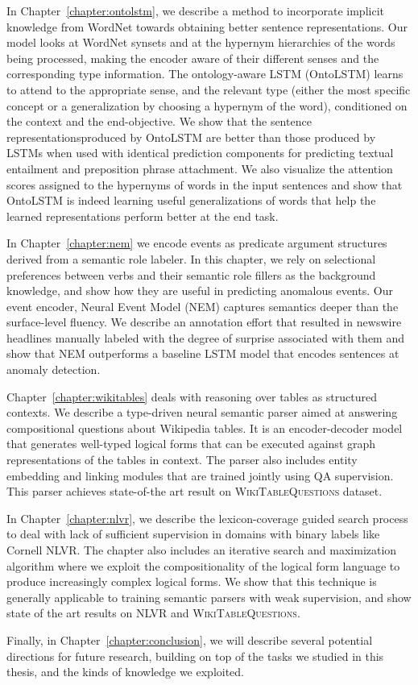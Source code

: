 In Chapter~\ref{chapter:ontolstm}, we describe a method to incorporate implicit knowledge
from WordNet towards obtaining better sentence representations. Our model looks at WordNet synsets
and at the hypernym hierarchies of the words being processed, making the 
encoder aware of their different senses and the corresponding type information.
The ontology-aware LSTM (OntoLSTM) learns to attend to the appropriate sense,
and the relevant type 
(either the most specific concept or a generalization by choosing a hypernym of
the word), conditioned on the context and the end-objective. We show that the sentence representationsproduced by OntoLSTM are better than those produced by LSTMs when used with identical prediction 
components for predicting textual entailment and preposition phrase attachment. We also visualize the attention scores assigned to the hypernyms 
of words in the input sentences and show that OntoLSTM is indeed learning useful generalizations of words
that help the learned representations perform better at the end task.

In Chapter~\ref{chapter:nem} we encode events as predicate argument structures derived from a semantic role labeler.
In this chapter, we rely on selectional preferences between verbs and their semantic role fillers as the background
knowledge, and show how they are useful in predicting anomalous events.
Our event encoder, Neural Event Model (NEM) captures semantics deeper than the surface-level fluency. We describe an annotation effort that
resulted in newswire headlines manually labeled with the degree of surprise associated with them and show that NEM outperforms
a baseline LSTM model that encodes sentences at anomaly detection. 

Chapter~\ref{chapter:wikitables} deals with reasoning over tables as structured contexts. We describe a type-driven
neural semantic parser aimed at answering compositional questions about Wikipedia tables. It is an encoder-decoder model that generates
well-typed logical forms that can be executed against graph representations of the tables in context. The parser also includes entity embedding
and linking modules that are trained jointly using QA supervision. This parser achieves state-of-the art result on \textsc{WikiTableQuestions} dataset.

In Chapter~\ref{chapter:nlvr}, we describe the lexicon-coverage guided search process to deal with lack of sufficient supervision in domains with binary labels like Cornell NLVR\@.
The chapter also includes an iterative search and maximization
algorithm where we exploit the compositionality of the logical form language to produce increasingly complex logical forms. We show that this
technique is generally applicable to training semantic parsers with weak supervision, and show state of the art results on NLVR and \textsc{WikiTableQuestions}.

Finally, in Chapter~\ref{chapter:conclusion}, we will describe several potential directions for future research, building on top of the tasks we studied in this thesis, and the kinds of knowledge we exploited.

